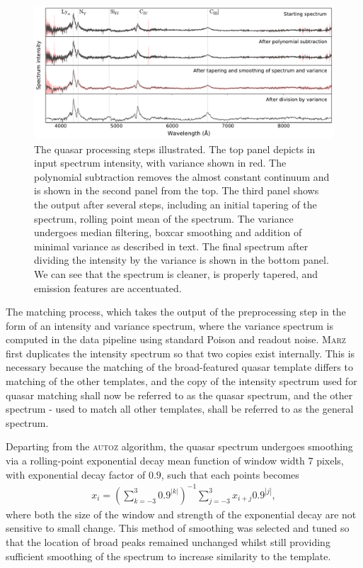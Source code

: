 \documentclass[iop]{emulateapj}
\newcommand{\autoz}{\textsc{autoz}}
\newcommand{\marz}{\textsc{Marz}}
\begin{document}
\begin{figure}[t]
\centering
\includegraphics[width=\textwidth]{quasarProcess.pdf}
\caption{The quasar processing steps illustrated. The top panel depicts in input spectrum intensity, with variance shown in red. The polynomial subtraction removes the almost constant continuum and is shown in the second panel from the top. The third panel shows the output after several steps, including an initial tapering of the spectrum, rolling point mean of the spectrum. The variance undergoes median filtering, boxcar smoothing and addition of minimal variance as described in text. The final spectrum after dividing the intensity by the variance is shown in the bottom panel. We can see that the spectrum is cleaner, is properly tapered, and emission features are accentuated.}
\label{fig:quasarProcess}
\end{figure}







The matching process, which takes the output of the preprocessing step in the form of an intensity and variance spectrum, where the variance spectrum is computed in the data pipeline using standard Poison and readout noise. \marz{} first duplicates the intensity spectrum so that two copies exist internally. This is necessary because the matching of the broad-featured quasar template differs to matching of the other templates, and the copy of the intensity spectrum used for quasar matching shall now be referred to as the quasar spectrum, and the other spectrum - used to match all other templates, shall be referred to as the general spectrum.

Departing from the \autoz{} algorithm, the quasar spectrum undergoes smoothing via a rolling-point exponential decay mean function of window width 7 pixels, with exponential decay factor of $0.9$, such that each points becomes
\begin{align}
x_i = \left( \sum_{k = -3}^3 0.9^{|k|}   \right)^{-1} \sum_{j = -3}^3 x_{i+j} 0.9^{|j|},
\end{align}
where both the size of the window and strength of the exponential decay are not sensitive to small change. This method of smoothing was selected and tuned so that the location of broad peaks remained unchanged whilst still providing sufficient smoothing of the spectrum to increase similarity to the template.\\
\end{document}
